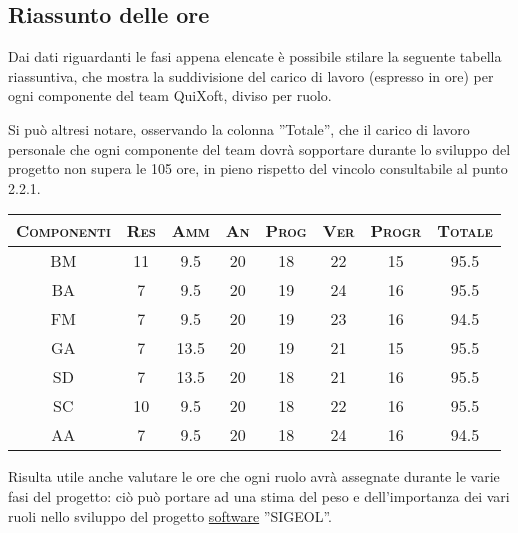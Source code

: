 \documentclass[11pt,a4paper]{article}
\begin{document}
\subsection{Riassunto delle ore}
Dai dati riguardanti le fasi appena elencate è possibile stilare la seguente tabella riassuntiva, che mostra la suddivisione del carico di lavoro (espresso in ore) per ogni componente del team QuiXoft, diviso per ruolo.

Si può altresi notare, osservando la colonna ''Totale'', che il carico di lavoro personale che ogni componente del team dovrà sopportare durante lo sviluppo del progetto non supera le 105 ore, in pieno rispetto del vincolo consultabile al punto 2.2.1.
\\ \bigskip
\begin{center}
\begin{tabular}{|c||c|c|c|c|c|c||c|}
\hline
\textsc{Componenti} & \textsc{Res} & \textsc{Amm} & \textsc{An} & \textsc{Prog} & \textsc{Ver} & \textsc{Progr} & \textsc{Totale}\\
\hline \hline
BM & 11 & 9.5 & 20 & 18 & 22 & 15 & 95.5 \\ \hline
BA & 7 & 9.5 & 20 & 19 & 24 & 16 & 95.5 \\ \hline
FM & 7 & 9.5 & 20 & 19 & 23 & 16 & 94.5 \\ \hline
GA & 7 & 13.5 & 20 & 19 & 21 & 15 & 95.5 \\ \hline
SD & 7 & 13.5 & 20 & 18 & 21 & 16 & 95.5 \\ \hline
SC & 10 & 9.5 & 20 & 18 & 22 & 16 & 95.5 \\ \hline
AA & 7 & 9.5 & 20 & 18 & 24 & 16 & 94.5 \\ \hline
\end{tabular}
\end{center}
\bigskip \bigskip \bigskip

Risulta utile anche valutare le ore che ogni ruolo avrà assegnate durante le varie fasi del progetto: ciò può portare ad una stima del peso e dell'importanza dei vari ruoli nello sviluppo del progetto \underline{software} ''SIGEOL''.
\end{document}
